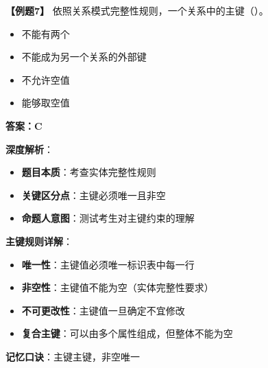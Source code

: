 \documentclass[12pt, a4paper]{article}
\newenvironment{bluebox}[1]{%
  \begin{trivlist}
  \item[\hskip\labelsep \textbf{#1}]
  \setlength{\parskip}{0.5ex}
  \setlength{\itemsep}{0.5ex}
}{%
  \end{trivlist}
}
\begin{document}
\begin{bluebox}{例题7：空值处理}
	\textbf{【例题7】} 依照关系模式完整性规则，一个关系中的主键（\quad）。

	\begin{itemize}
		\item[A)] 不能有两个
		\item[B)] 不能成为另一个关系的外部键
		\item[C)] 不允许空值
		\item[D)] 能够取空值
	\end{itemize}

	\textbf{答案：C}

	\textbf{深度解析}：

	\begin{itemize}
		\item \textbf{题目本质}：考查实体完整性规则
		\item \textbf{关键区分点}：主键必须唯一且非空
		\item \textbf{命题人意图}：测试考生对主键约束的理解
	\end{itemize}

	\textbf{主键规则详解}：

	\begin{itemize}
		\item \textbf{唯一性}：主键值必须唯一标识表中每一行
		\item \textbf{非空性}：主键值不能为空（实体完整性要求）
		\item \textbf{不可更改性}：主键值一旦确定不宜修改
		\item \textbf{复合主键}：可以由多个属性组成，但整体不能为空
	\end{itemize}

	\textbf{记忆口诀}：主键主键，非空唯一
\end{bluebox}
\end{document}
